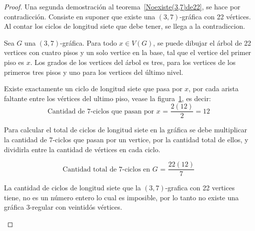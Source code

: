 \documentclass[11pt]{book}
\theoremstyle{definition}
\begin{document}
\begin{proof} Una segunda demostración al teorema~\ref{Noexiste(3,7)de22},
  se hace por contradicción. Consiste en suponer que existe una 
  $(3,7)$-gráfica con 22 vértices. Al contar los ciclos de
  longitud siete que debe tener, se llega a la contradiccion.

Sea $G$ una $(3,7)$-gráfica. Para todo $x\in V(G)$, se
puede dibujar el árbol de 22 vertices con cuatro pisos y un solo
vertice en la base, tal que el
vertice del primer piso es $x$. Los grados de los vertices del árbol
es tres, para los vertices de los primeros tres pisos y uno para los
vertices del último nivel.

Existe exactamente un ciclo de longitud siete que pasa por $x$, por cada
arista faltante entre los vértices del ultimo piso,
vease la figura~\ref{arbol(3,7)contarciclos}, es decir:
\begin{equation*}
\text{Cantidad de 7-ciclos que pasan por $x$ = }\frac{2(12)}{2}=12
\end{equation*}

Para calcular el total de ciclos de longitud siete en la gráfica se
debe multiplicar la cantidad de 7-ciclos que pasan por
un vertice, por la
cantidad total de ellos, y dividirla entre la cantidad de
vértices en cada ciclo.

\begin{equation*}
\text{Cantidad total de 7-ciclos en $G$ = } \frac{22(12)}{7}  
\end{equation*}

La cantidad de ciclos de longitud siete que la $(3,7)$-grafica con 22
vertices tiene, no es un
número entero lo cual es
imposible, por lo tanto no existe una gráfica $3$-regular con
veintidós vértices.


\begin{figure}
  \centering

  \caption{} \label{arbol(3,7)contarciclos}
\end{figure}

\end{proof}
\end{document}
